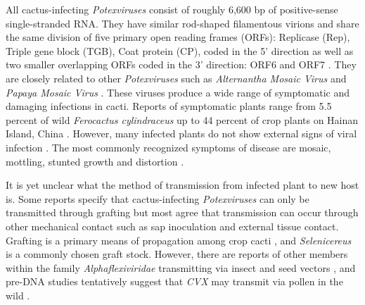 \documentclass[11pt,letterpaper,titlepage]{article}
\begin{document}
\begin{linenumbers}
All cactus-infecting \textit{Potexviruses} consist of roughly 6,600 bp of positive-sense single-stranded RNA. They have similar rod-shaped filamentous virions and share the same division of five primary open reading frames (ORFs): Replicase (Rep), Triple gene block (TGB), Coat protein (CP), coded in the 5' direction as well as two smaller overlapping ORFs coded in the 3' direction: ORF6 and ORF7 \citep{evallo_brief_2021,liou_complete_2004, martelli_family_2007}.
They are closely related to other \textit{Potexviruses} such as \textit{Alternantha Mosaic Virus} and \textit{Papaya Mosaic Virus} \citep{martelli_family_2007,park_detection_2018,liou_complete_2004}.
These viruses produce a wide range of symptomatic and damaging infections in cacti. 
Reports of symptomatic plants range from 5.5 percent of wild \textit{Ferocactus cylindraceus} \citep{attathom_occurrence_1978} up to 44 percent of crop plants on Hainan Island, China \citep{peng_molecular_2016}.
However, many infected plants do not show external signs of viral infection \citep{liou_complete_2004, bos_symptoms_1977}.
The most commonly recognized symptoms of disease are mosaic, mottling, stunted growth and distortion \citep{maliarenko_cactus_2013, peng_molecular_2016, attathom_occurrence_1978}.

It is yet unclear what the method of transmission from infected plant to new host is. 
Some reports specify that cactus-infecting \textit{Potexviruses} can only be transmitted through grafting \citep{duarte_Potexvirus_2008, martelli_family_2007} but most agree that transmission can occur through other mechanical contact such as sap inoculation \citep{liou_complete_2004,maliarenko_cactus_2013,park_detection_2018} and external tissue contact.
Grafting is a primary means of propagation among crop cacti \citep{park_detection_2018}, and \textit{Selenicereus} is a commonly chosen graft stock.
However, there are reports of other members within the family \textit{Alphaflexiviridae} transmitting via insect and seed vectors \citep{martelli_family_2007}, and pre-DNA studies tentatively suggest that \textit{CVX} may transmit via pollen in the wild \citep{attathom_occurrence_1978}.


\end{linenumbers}
\end{document}
